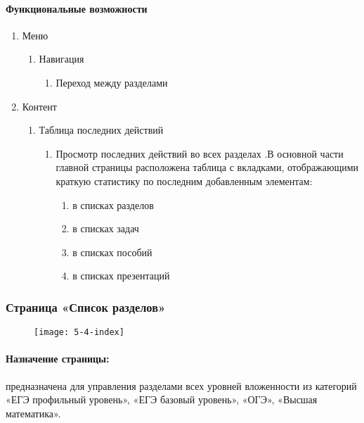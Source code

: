 \paragraph{Функциональные возможности}
\begin{enumerate}
	\item Меню
	\begin{enumerate}
		\item Навигация
		\begin{enumerate}
			\item Переход между разделами
		\end{enumerate}
	\end{enumerate}

	\item Контент
	\begin{enumerate}
		\item Таблица последних действий
		\begin{enumerate}
			\item Просмотр последних действий во всех разделах .В основной части главной страницы расположена таблица с вкладками, отображающими краткую статистику по последним добавленным элементам:
			\begin{enumerate}
				\item  в списках разделов
				\item  в списках задач
				\item  в списках пособий
				\item  в списках презентаций
			\end{enumerate}
		\end{enumerate}
	\end{enumerate}
\end{enumerate}

\subsubsection{Страница «Список разделов»}
\begin{figure}[H]
	\texttt{[image: 5-4-index]}
\end{figure}
\paragraph{Назначение страницы:} предназначена для управления разделами всех уровней вложенности из категорий «ЕГЭ профильный уровень», «ЕГЭ базовый уровень», «ОГЭ», «Высшая математика».

